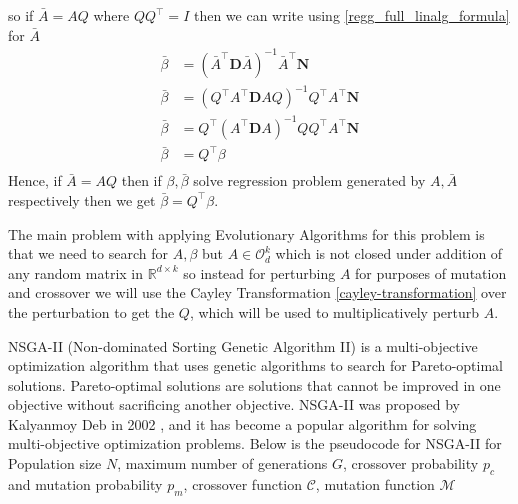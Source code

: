 \newline so if $\bar{A}=AQ$ where $QQ^\top = I$ then we can write using \ref{regg_full_linalg_formula} for $\bar{A}$
\begin{equation}
\begin{aligned} 
    \bar{\beta} &= (\bar{A}^\top \mathbf{D} \bar{A})^{-1} \bar{A}^\top \mathbf{N}\\
    \bar{\beta} &= (Q^\top A^\top \mathbf{D} AQ)^{-1} Q^\top A^\top \mathbf{N}\\
    \bar{\beta} &= Q^\top (A^\top \mathbf{D} A)^{-1} Q Q^\top A^\top \mathbf{N}\\
    \bar{\beta} &= Q^\top \beta\\
\end{aligned}
\end{equation}
Hence, if $\bar{A} = AQ$ then if $\beta, \bar{\beta}$ solve regression problem generated by $A, \bar{A}$ respectively then we get $\bar{\beta} = Q^\top\beta$. 

\newpage
{}
The main problem with applying Evolutionary Algorithms for this problem is that we need to search for $A,\beta$ but $A \in \mathcal{O}^{k}_{d}$ which is not closed under addition of any random matrix in $\mathbb{R}^{d\times k}$ so instead for perturbing $A$ for purposes of mutation and crossover we will use the Cayley Transformation \ref{cayley-transformation} over the perturbation to get the $Q$, which will be used to multiplicatively perturb $A$.

NSGA-II (Non-dominated Sorting Genetic Algorithm II) is a multi-objective optimization algorithm that uses genetic algorithms to search for Pareto-optimal solutions. Pareto-optimal solutions are solutions that cannot be improved in one objective without sacrificing another objective. NSGA-II was proposed by Kalyanmoy Deb in 2002 \cite{deb2002fast}, and it has become a popular algorithm for solving multi-objective optimization problems.
\newline \newline Below is the pseudocode for NSGA-II for Population size $N$, maximum number of generations $G$, crossover probability $p_c$ and mutation probability $p_m$, crossover function $\mathcal{C}$, mutation function $\mathcal{M}$

